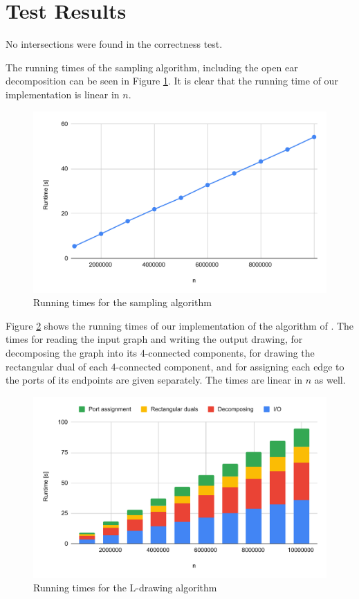 \documentclass[a4paper]{article}
\begin{document}
\section{Test Results}\label{sec:results}
No intersections were found in the correctness test.

The running times of the sampling algorithm, including the open ear
decomposition can be seen in Figure \ref{fig:sampling}.
It is clear that the running time of our implementation is linear in $n$.

\begin{figure}[ht]
    \includegraphics[width=\textwidth]{sampling.pdf}
    \caption{Running times for the sampling algorithm}
    \label{fig:sampling}
\end{figure}

Figure \ref{fig:results} shows the running times of our implementation of the
algorithm of \citet{ldrawing}.
The times for reading the input graph and writing the output drawing, for
decomposing the graph into its 4-connected components, for drawing the
rectangular dual of each 4-connected component, and for assigning each edge to
the ports of its endpoints are given separately.
The times are linear in $n$ as well.

\begin{figure}[ht]
    \center
    \includegraphics[width=\textwidth]{results.pdf}
    \caption{Running times for the L-drawing algorithm}
    \label{fig:results}
\end{figure}
\end{document}
